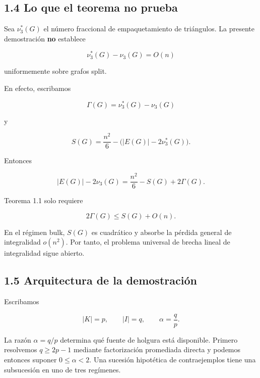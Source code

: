 \documentclass[
  11pt,
]{article}
\begin{document}
\subsection{1.4 Lo que el teorema no prueba}\label{lo-que-el-teorema-no-prueba}

Sea \(\nu_3^*(G)\) el número fraccional de empaquetamiento de triángulos. La presente demostración \textbf{no} establece

\[
\nu_3^*(G)-\nu_3(G)=O(n)
\tag{1.4}
\]

uniformemente sobre grafos split.

En efecto, escribamos

\[
\Gamma(G)=\nu_3^*(G)-\nu_3(G)
\]

y

\[
S(G)=\frac{n^2}{6}-\bigl(|E(G)|-2\nu_3^*(G)\bigr).
\]

Entonces

\[
|E(G)|-2\nu_3(G)
=
\frac{n^2}{6}-S(G)+2\Gamma(G).
\tag{1.5}
\]

Teorema 1.1 solo requiere

\[
2\Gamma(G)\le S(G)+O(n).
\]

En el régimen bulk, \(S(G)\) es cuadrático y absorbe la pérdida general de integralidad \(o(n^2)\). Por tanto, el problema universal de brecha lineal de integralidad sigue abierto.

\subsection{1.5 Arquitectura de la demostración}\label{arquitectura-de-la-demostraciuxf3n}

Escribamos

\[
|K|=p,
\qquad
|I|=q,
\qquad
\alpha=\frac qp.
\]

La razón \(\alpha=q/p\) determina qué fuente de holgura está disponible. Primero resolvemos \(q\ge2p-1\) mediante factorización promediada directa y podemos entonces suponer \(0\le\alpha<2\). Una sucesión hipotética de contraejemplos tiene una subsucesión en uno de tres regímenes.
\end{document}

